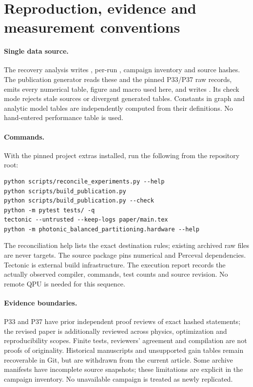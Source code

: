 \documentclass[11pt,a4paper]{article}
\theoremstyle{remark}\newtheorem{remark}[theorem]{Remark}
\begin{document}
\section{Reproduction, evidence and measurement conventions}\label{app:repro}
\paragraph{Single data source.}
The recovery analysis writes , per-run , campaign inventory and source hashes. The publication generator reads these and the pinned P33/P37 raw records, emits every numerical table, figure and macro used here, and writes . Its check mode rejects stale sources or divergent generated tables. Constants in graph and analytic model tables are independently computed from their definitions. No hand-entered performance table is used.

\paragraph{Commands.}
With the pinned project extras installed, run the following from the repository root:
\begin{verbatim}
python scripts/reconcile_experiments.py --help
python scripts/build_publication.py
python scripts/build_publication.py --check
python -m pytest tests/ -q
tectonic --untrusted --keep-logs paper/main.tex
python -m photonic_balanced_partitioning.hardware --help
\end{verbatim}
The reconciliation help lists the exact destination rules; existing archived raw files are never targets. The source package pins numerical and Perceval dependencies. Tectonic is external build infrastructure. The execution report records the actually observed compiler, commands, test counts and source revision. No remote QPU is needed for this sequence.

\paragraph{Evidence boundaries.}
P33 and P37 have prior independent proof reviews of exact hashed statements; the revised paper is additionally reviewed across physics, optimization and reproducibility scopes. Finite tests, reviewers' agreement and compilation are not proofs of originality. Historical manuscripts and unsupported gain tables remain recoverable in Git, but are withdrawn from the current article. Some archive manifests have incomplete source snapshots; these limitations are explicit in the campaign inventory. No unavailable campaign is treated as newly replicated.
\end{document}
